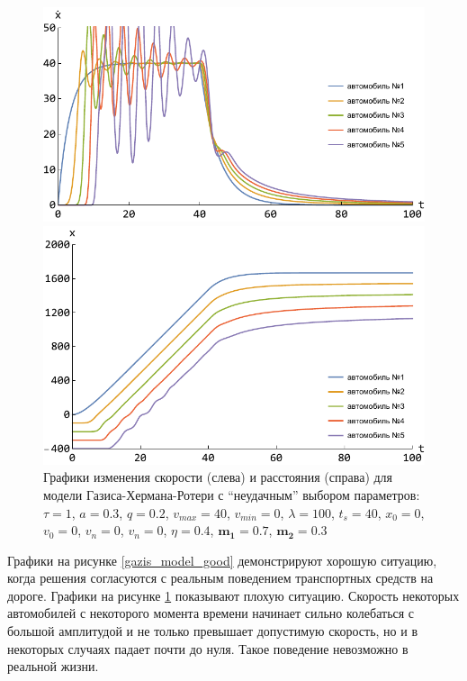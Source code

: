\documentclass[12pt, a4paper]{extarticle}
\numberwithin{equation}{section}
\begin{document}
\begin{figure}[h!]
	\begin{center}
		\begin{minipage}[h!]{0.48\linewidth}
			\includegraphics[width=1\linewidth,height=0.2\textheight]
			{Images/gazis_model_bad_speed.pdf}
		\end{minipage}
		\hfill 
		\begin{minipage}[h!]{0.48\linewidth}
			\includegraphics[width=1\linewidth,height=0.2\textheight]
			{Images/gazis_model_bad_distance.pdf}
		\end{minipage}
		\caption{Графики изменения скорости (слева) и расстояния (справа) для модели Газиса-Хермана-Ротери с ``неудачным'' выбором параметров: $\tau=1$, $a=0.3$, $q=0.2$, $v_{max}=40$, $v_{min}=0$, $\lambda=100$, $t_s=40$, $x_0=0$, $v_0=0$, $v_n=0$, $v_n=0$, $\eta=0.4$, $\boldsymbol{m_1=0.7}$, $\boldsymbol{m_2=0.3}$}
		\label{gazis_model_bad}
	\end{center}
\end{figure}

Графики на рисунке \ref{gazis_model_good} демонстрируют хорошую ситуацию, когда решения согласуются с реальным поведением транспортных средств на дороге. Графики на рисунке \ref{gazis_model_bad} показывают плохую ситуацию. Скорость некоторых автомобилей с некоторого момента времени начинает сильно колебаться с большой амплитудой и не только превышает допустимую скорость, но и в некоторых случаях падает почти до нуля. Такое поведение невозможно в реальной жизни.
\end{document}
